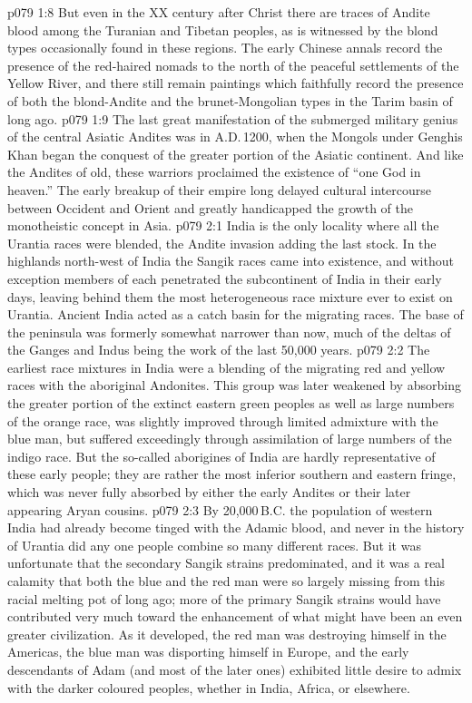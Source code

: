 \vs p079 1:8 But even in the XX century after Christ there are traces of Andite blood among the Turanian and Tibetan peoples, as is witnessed by the blond types occasionally found in these regions. The early Chinese annals record the presence of the red\hyp{}haired nomads to the north of the peaceful settlements of the Yellow River, and there still remain paintings which faithfully record the presence of both the blond\hyp{}Andite and the brunet\hyp{}Mongolian types in the Tarim basin of long ago.
\vs p079 1:9 The last great manifestation of the submerged military genius of the central Asiatic Andites was in A.D.\,1200, when the Mongols under Genghis Khan began the conquest of the greater portion of the Asiatic continent. And like the Andites of old, these warriors proclaimed the existence of “one God in heaven.” The early breakup of their empire long delayed cultural intercourse between Occident and Orient and greatly handicapped the growth of the monotheistic concept in Asia.
\vs p079 2:1 India is the only locality where all the Urantia races were blended, the Andite invasion adding the last stock. In the highlands north\hyp{}west of India the Sangik races came into existence, and without exception members of each penetrated the subcontinent of India in their early days, leaving behind them the most heterogeneous race mixture ever to exist on Urantia. Ancient India acted as a catch basin for the migrating races. The base of the peninsula was formerly somewhat narrower than now, much of the deltas of the Ganges and Indus being the work of the last 50,000 years.
\vs p079 2:2 The earliest race mixtures in India were a blending of the migrating red and yellow races with the aboriginal Andonites. This group was later weakened by absorbing the greater portion of the extinct eastern green peoples as well as large numbers of the orange race, was slightly improved through limited admixture with the blue man, but suffered exceedingly through assimilation of large numbers of the indigo race. But the so\hyp{}called aborigines of India are hardly representative of these early people; they are rather the most inferior southern and eastern fringe, which was never fully absorbed by either the early Andites or their later appearing Aryan cousins.
\vs p079 2:3 \pc By 20,000\,B.C. the population of western India had already become tinged with the Adamic blood, and never in the history of Urantia did any one people combine so many different races. But it was unfortunate that the secondary Sangik strains predominated, and it was a real calamity that both the blue and the red man were so largely missing from this racial melting pot of long ago; more of the primary Sangik strains would have contributed very much toward the enhancement of what might have been an even greater civilization. As it developed, the red man was destroying himself in the Americas, the blue man was disporting himself in Europe, and the early descendants of Adam (and most of the later ones) exhibited little desire to admix with the darker coloured peoples, whether in India, Africa, or elsewhere.

